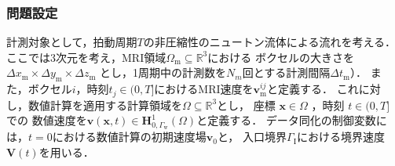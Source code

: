 \subsubsection{問題設定}
計測対象として，拍動周期$T$の非圧縮性のニュートン流体による流れを考える．
ここでは3次元を考え，MRI領域$\Omega_{\text{m}} \subseteq \mathbb{R}^3$における
ボクセルの大きさを$\Delta x_{\mathrm{m}} \times \Delta y_{\mathrm{m}} \times \Delta z_{\mathrm{m}}$
とし，1周期中の計測数を$N_m$回とする計測間隔$\Delta t_{\text{m}}$）．
また，ボクセル$i$，時刻$t_{j} \in(0, T]$におけるMRI速度を$\mathbf{v}^{ij}_{\mathrm{m}}$と定義する．
これに対し，数値計算を適用する計算領域を$\Omega \subseteq \mathbb{R}^3$とし，
座標 $\mathbf{x} \in \Omega$ ，時刻 $t \in(0, T]$ での
数値速度を$\mathbf{v}(\mathbf{x}, t) \in \mathbf{H}_{0,\Gamma_{\mathrm{w}}}^1(\Omega)$と定義する．
データ同化の制御変数には，$t=0$における数値計算の初期速度場$\mathbf{v}_0$と，
入口境界$\Gamma_{\mathrm{I}}$における境界速度$\mathbf{V}(t)$を用いる．

